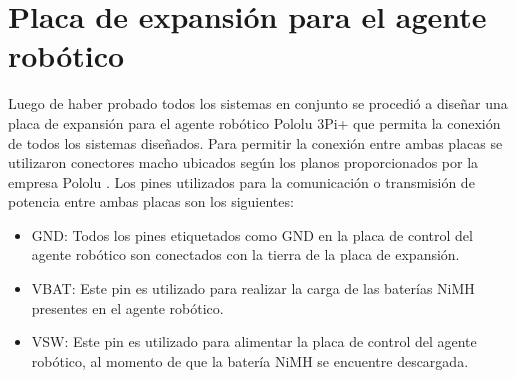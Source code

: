 \section{Placa de expansión para el agente robótico}

Luego de haber probado todos los sistemas en conjunto se procedió a diseñar
una placa de expansión para el agente robótico Pololu 3Pi+ que permita
la conexión de todos los sistemas diseñados. Para permitir la conexión
 entre ambas placas se utilizaron conectores 
macho ubicados según los planos proporcionados por la 
empresa Pololu \cite{noauthor_pololu_nodate}.
Los pines utilizados para la comunicación o transmisión de potencia entre
ambas placas son los siguientes:

\begin{itemize}
    \item GND: Todos los pines etiquetados como GND en la placa de control
    del agente robótico son conectados con la tierra de la placa de expansión.
    \item VBAT: Este pin es utilizado para realizar la carga de las baterías
    NiMH presentes en el agente robótico.
    \item VSW: Este pin es utilizado para alimentar la placa de 
    control del agente robótico, al momento de que la batería NiMH 
    se encuentre descargada.

\end{itemize}
